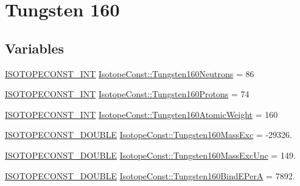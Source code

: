 \hypertarget{group___isotope_const-_tungsten-_w160}{}\section{Tungsten 160}
\label{group___isotope_const-_tungsten-_w160}
\subsection*{Variables}
\begin{DoxyCompactItemize}
\item 
\mbox{\hyperlink{group___isotope_const-_macros_ga5f18360b3e99483a35c32d789e62621c}{I\+S\+O\+T\+O\+P\+E\+C\+O\+N\+S\+T\+\_\+\+I\+NT}} \mbox{\hyperlink{group___isotope_const-_tungsten-_w160_ga130f359105b9f5e168c7dc923e94a21b}{Isotope\+Const\+::\+Tungsten160\+Neutrons}} = 86
\item 
\mbox{\hyperlink{group___isotope_const-_macros_ga5f18360b3e99483a35c32d789e62621c}{I\+S\+O\+T\+O\+P\+E\+C\+O\+N\+S\+T\+\_\+\+I\+NT}} \mbox{\hyperlink{group___isotope_const-_tungsten-_w160_ga6c2462db4222bb5ba056e738b8f99c72}{Isotope\+Const\+::\+Tungsten160\+Protons}} = 74
\item 
\mbox{\hyperlink{group___isotope_const-_macros_ga5f18360b3e99483a35c32d789e62621c}{I\+S\+O\+T\+O\+P\+E\+C\+O\+N\+S\+T\+\_\+\+I\+NT}} \mbox{\hyperlink{group___isotope_const-_tungsten-_w160_gab99cf53f7b262967b0a46cabf53657c5}{Isotope\+Const\+::\+Tungsten160\+Atomic\+Weight}} = 160
\item 
\mbox{\hyperlink{group___isotope_const-_macros_ga8f45a7272ce02c0b4c65c44636ed719a}{I\+S\+O\+T\+O\+P\+E\+C\+O\+N\+S\+T\+\_\+\+D\+O\+U\+B\+LE}} \mbox{\hyperlink{group___isotope_const-_tungsten-_w160_ga4f326970acd4e19410e2e045a1742b62}{Isotope\+Const\+::\+Tungsten160\+Mass\+Exc}} = -\/29326.
\item 
\mbox{\hyperlink{group___isotope_const-_macros_ga8f45a7272ce02c0b4c65c44636ed719a}{I\+S\+O\+T\+O\+P\+E\+C\+O\+N\+S\+T\+\_\+\+D\+O\+U\+B\+LE}} \mbox{\hyperlink{group___isotope_const-_tungsten-_w160_gaa5f086945a191810a8b905ed8b917466}{Isotope\+Const\+::\+Tungsten160\+Mass\+Exc\+Unc}} = 149.
\item 
\mbox{\hyperlink{group___isotope_const-_macros_ga8f45a7272ce02c0b4c65c44636ed719a}{I\+S\+O\+T\+O\+P\+E\+C\+O\+N\+S\+T\+\_\+\+D\+O\+U\+B\+LE}} \mbox{\hyperlink{group___isotope_const-_tungsten-_w160_ga74e67cde9f5518f853399bdc262a60d5}{Isotope\+Const\+::\+Tungsten160\+Bind\+E\+PerA}} = 7892.
\item 

\end{DoxyCompactItemize}
